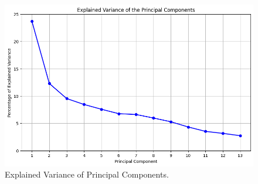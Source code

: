 \begin{figure}[htbp]
    \centerline{\includegraphics[width=0.8\columnwidth]{img/pca.png}}
    \caption{Explained Variance of Principal Components.}\label{pca}
\end{figure}
